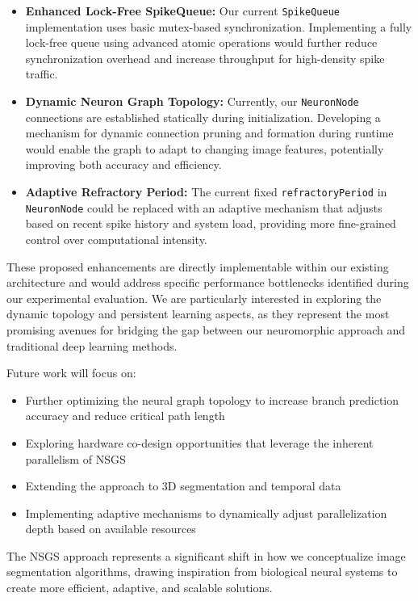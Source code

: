 \documentclass[conference]{IEEEtran}
\begin{document}
\begin{itemize}
    \item \textbf{Enhanced Lock-Free SpikeQueue:} Our current \texttt{SpikeQueue} implementation uses basic mutex-based synchronization. Implementing a fully lock-free queue using advanced atomic operations would further reduce synchronization overhead and increase throughput for high-density spike traffic.
    
    \item \textbf{Dynamic Neuron Graph Topology:} Currently, our \texttt{NeuronNode} connections are established statically during initialization. Developing a mechanism for dynamic connection pruning and formation during runtime would enable the graph to adapt to changing image features, potentially improving both accuracy and efficiency.

    \item \textbf{Adaptive Refractory Period:} The current fixed \texttt{refractoryPeriod} in \texttt{NeuronNode} could be replaced with an adaptive mechanism that adjusts based on recent spike history and system load, providing more fine-grained control over computational intensity.

\end{itemize}

These proposed enhancements are directly implementable within our existing architecture and would address specific performance bottlenecks identified during our experimental evaluation. We are particularly interested in exploring the dynamic topology and persistent learning aspects, as they represent the most promising avenues for bridging the gap between our neuromorphic approach and traditional deep learning methods.

Future work will focus on:
\begin{itemize}
    \item Further optimizing the neural graph topology to increase branch prediction accuracy and reduce critical path length
    \item Exploring hardware co-design opportunities that leverage the inherent parallelism of NSGS
    \item Extending the approach to 3D segmentation and temporal data
    \item Implementing adaptive mechanisms to dynamically adjust parallelization depth based on available resources
\end{itemize}

The NSGS approach represents a significant shift in how we conceptualize image segmentation algorithms, drawing inspiration from biological neural systems to create more efficient, adaptive, and scalable solutions.




\end{document}
